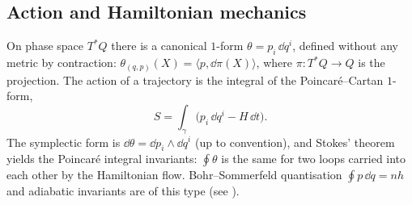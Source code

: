 \subsection{Action and Hamiltonian mechanics}\label{sec:phys-hamilton}

On phase space $T^*Q$ there is a canonical $1$-form $\theta=p_i\,\dd q^i$, defined without any metric by contraction: $\theta_{(q,p)}(X)=\langle p,\dd\pi(X)\rangle$, where $\pi:T^*Q\to Q$ is the projection. The action of a trajectory is the integral of the Poincar\'e--Cartan $1$-form,
\begin{equation}\label{eq:action}
S=\int_\gamma\bigl(p_i\,\dd q^i-H\,\dd t\bigr).
\end{equation}
The symplectic form is $\dd\theta=\dd p_i\wedge\dd q^i$ (up to convention), and Stokes' theorem yields the Poincar\'e integral invariants: $\oint\theta$ is the same for two loops carried into each other by the Hamiltonian flow. Bohr--Sommerfeld quantisation $\oint p\,\dd q=nh$ and adiabatic invariants are of this type (see \cite{Arnold}).

